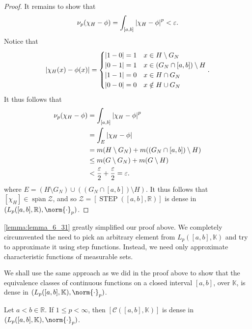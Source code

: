 \documentclass[notoc,notitlepage]{tufte-book}
\DeclareMathOperator{\STEP}{STEP}
\DeclareMathOperator{\Span}{span}
\begin{document}
\begin{proof}
  It remains to show that
  \begin{equation*}
    \nu_p(\chi_H - \phi) = \int_{[a, b]} \left|\chi_H - \phi\right|^p < \varepsilon.
  \end{equation*}
  Notice that
  \begin{align*}
    \left|\chi_H(x) - \phi(x)\right| = \begin{cases}
      \left|1 - 0\right| = 1 & x \in H \setminus G_N \\
      \left|0 - 1\right| = 1 & x \in (G_N \cap [a, b]) \setminus H \\
      \left|1 - 1\right| = 0 & x \in H \cap G_N \\
      \left|0 - 0\right| = 0 & x \notin H \cup G_N
    \end{cases}.
  \end{align*}
  It thus follows that
  \begin{align*}
    \nu_p(\chi_H - \phi)
    &= \int_{[a, b]} \left|\chi_H - \phi\right|^p \\
    &= \int_{E} \left|\chi_H - \phi\right| \\
    &= m(H \setminus G_N) + m((G_N \cap [a, b]) \setminus H) \\
    &\leq m(G \setminus G_N) + m(G \setminus H) \\
    &< \frac{\varepsilon}{2} + \frac{\varepsilon}{2} = \varepsilon.
  \end{align*}
  where $E = (H \setminus G_N) \cup ((G_N \cap [a, b]) \setminus H)$.
  It thus follows that $[\chi_H] \in \overline{\Span} \mathcal{Z}$,
  and so $\mathcal{Z} = [\STEP([a, b], \mathbb{R})]$ is dense in \\ \noindent
  $(L_p([a, b], \mathbb{R}), \norm{\cdot}_p)$.
\end{proof}

\begin{note}
  \cref{lemma:lemma_6_31} greatly simplified our proof above.
  We completely circumvented the need to pick an arbitrary element
  from $L_p([a, b], \mathbb{K})$ and try to approximate it
  using step functions.
  Instead, we need only approximate characteristic functions of measurable sets.

  We shall use the same approach as we did in the proof above
  to show that the equivalence classes of continuous functions
  on a closed interval $[a, b]$, over $\mathbb{K}$, is dense
  in $(L_p([a, b], \mathbb{K}), \norm{\cdot}_p)$.
\end{note}

\begin{thm}\label{thm:density_of_equivalence_classes_of_continuous_functions_in_l_p_spaces}
  Let $a < b \in \mathbb{R}$. If $1 \leq p < \infty$, then $[\mathcal{C}([a, b],
  \mathbb{K})]$ is dense in $(L_p([a, b], \mathbb{K}), \norm{\cdot}_p)$.
\end{thm}
\end{document}
